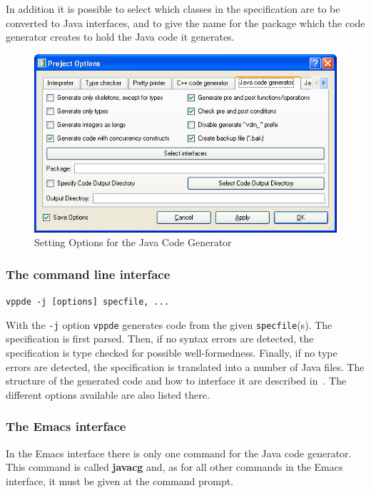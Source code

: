 \documentclass[\pformat,12pt]{article}
\newcommand{\vdmde}{vppde}
\begin{document}
In addition it is possible to select which classes in the
specification are to be converted to Java interfaces, and to give the
name for the package which the code generator creates to hold the Java
code it generates.


\begin{figure}[tbh]
\begin{center}
\includegraphics[width=12cm]{jcgOptions-ppENG.png}
\caption{Setting Options for the Java Code Generator}
\label{fig:optjcg}
\end{center}
\end{figure}

\subsubsection{The command line interface}

{\tt \vdmde\ -j [options] specfile, ...}

With the {\tt -j} option {\tt \vdmde} generates code from the given
{\tt specfile}(s). The specification is first parsed. Then, if no
syntax errors are detected, the specification is type checked for
possible well-formedness. Finally,
if no type errors are detected, the specification is translated into a
number of Java files. The structure of the generated
code and how to interface it are described in~\cite{CGJavaManPP-SCSK}. The
different options available are also listed there.


\subsubsection{The Emacs interface}

In the Emacs interface there is only one command for the Java code generator.
This command is called \textbf{javacg}
and, as for all other commands in the Emacs interface, it must be given at
the command prompt.
\end{document}
